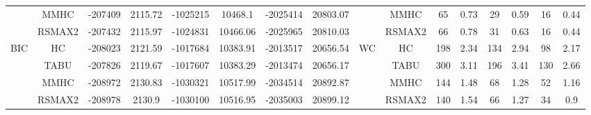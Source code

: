 \begin{table}[p]
{\begin{tabular}{cc||cc|cc|cc||cc|cc|cc|cc}
& MMHC &	-207409 & 	2115.72 & 	-1025215 & 	10468.1 & 	-2025414 & 	20803.07 & 	& MMHC &	65 & 	0.73 & 	29 & 	0.59 & 	16 & 	0.44\tabularnewline													
& RSMAX2 &	-207432 & 	2115.97 & 	-1024831 & 	10466.06 & 	-2025965 & 	20810.03 & 	& RSMAX2 &	66 & 	0.78 & 	31 & 	0.63 & 	16 & 	0.44\tabularnewline													
\hline																										
\multirow{4}{*}{BIC} & HC &	-208023 & 	2121.59 & 	-1017684 & 	10383.91 & 	-2013517 & 	20656.54 & 	\multirow{4}{*}{WC} & HC &	198 & 	2.34 & 	134 & 	2.94 & 	98 & 	2.17\tabularnewline													
& TABU &	-207826 & 	2119.67 & 	-1017607 & 	10383.29 & 	-2013474 & 	20656.17 & 	& TABU &	300 & 	3.11 & 	196 & 	3.41 & 	130 & 	2.66\tabularnewline													
& MMHC &	-208972 & 	2130.83 & 	-1030321 & 	10517.99 & 	-2034514 & 	20892.87 & 	& MMHC &	144 & 	1.48 & 	68 & 	1.28 & 	52 & 	1.16\tabularnewline													
& RSMAX2 &	-208978 & 	2130.9 & 	-1030100 & 	10516.95 & 	-2035003 & 	20899.12 & 	& RSMAX2 &	140 & 	1.54 & 	66 & 	1.27 & 	34 & 	0.9\tabularnewline													
\hline																										
\end{tabular}																										
}																										
\end{table}																										


